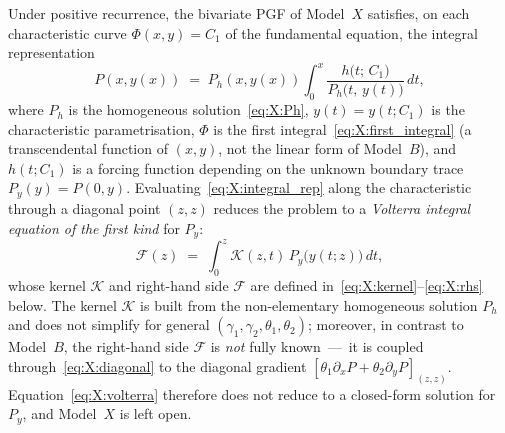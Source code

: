 \begin{claim}\label{clm:X:volterra}
    Under positive recurrence, the bivariate PGF of Model~$X$ satisfies, on each
    characteristic curve $\Phi(x,y)=C_1$ of the fundamental equation, the integral
    representation
    \begin{equation}
        P(x,y(x)) \;=\; P_h(x,y(x))\int_{0}^{x}
        \frac{h\bigl(t;\,C_1\bigr)}{P_h\bigl(t,\,y(t)\bigr)}\,dt,
        \label{eq:X:integral_rep}
    \end{equation}
    where $P_h$ is the homogeneous solution~\eqref{eq:X:Ph}, $y(t)=y(t;C_1)$ is the
    characteristic parametrisation, $\Phi$ is the first integral~\eqref{eq:X:first_integral}
    (a transcendental function of $(x,y)$, not the linear form of Model~$B$), and
    $h(t;C_1)$ is a forcing function depending on the unknown boundary trace
    $P_y(y)=P(0,y)$. Evaluating~\eqref{eq:X:integral_rep} along the characteristic
    through a diagonal point $(z,z)$ reduces the problem to a \emph{Volterra integral
    equation of the first kind} for $P_y$:
    \begin{equation}
        \mathcal{F}(z) \;=\; \int_0^z \mathcal{K}(z,t)\,P_y\!\bigl(y(t;z)\bigr)\,dt,
        \label{eq:X:volterra}
    \end{equation}
    whose kernel $\mathcal{K}$ and right-hand side $\mathcal{F}$ are defined
    in~\eqref{eq:X:kernel}--\eqref{eq:X:rhs} below. The kernel $\mathcal{K}$ is built
    from the non-elementary homogeneous solution $P_h$ and does not simplify for general
    $(\gamma_1,\gamma_2,\theta_1,\theta_2)$; moreover, in contrast to Model~$B$, the
    right-hand side $\mathcal{F}$ is \emph{not} fully known~---~it is coupled
    through~\eqref{eq:X:diagonal} to the diagonal gradient
    $[\theta_1\partial_x P+\theta_2\partial_y P]_{(z,z)}$. Equation~\eqref{eq:X:volterra}
    therefore does not reduce to a closed-form solution for $P_y$, and Model~$X$ is left
    open.
\end{claim}

